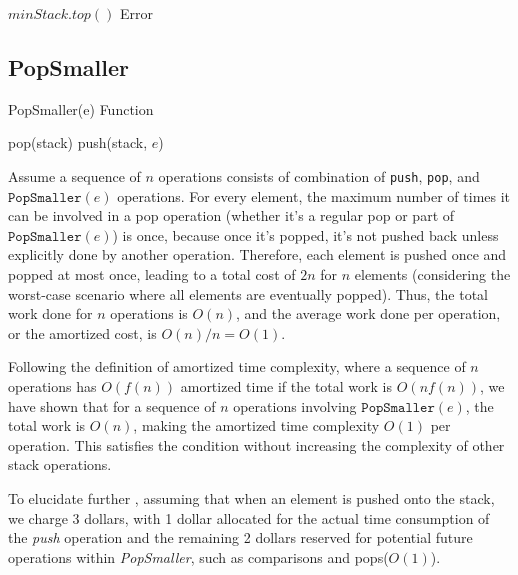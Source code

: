 \documentclass[12pt]{article}
\begin{document}
\begin{algorithm*}
    \begin{algorithmic}[1]
            \State \Return $minStack.top()$
        \Else
            \State \Return Error 
        \EndIf
    \EndFunction
    \end{algorithmic}
\end{algorithm*}

     
    
\newpage

\subsection*{PopSmaller}   

\begin{algorithm}
    \caption{PopSmaller(e) Function}
    \begin{algorithmic}[1]
            \State pop(stack)
        \EndWhile
        \State push(stack, $e$)
    \EndFunction
    \end{algorithmic}
\end{algorithm}

Assume a sequence of $n$ operations consists of combination of 
\texttt{push}, \texttt{pop}, and $\texttt{PopSmaller}(e)$ operations. 
For every element, the maximum number of times it can be involved 
in a pop operation (whether it's a regular pop or part of 
$\texttt{PopSmaller}(e)$) is once, because once it's popped, it's 
not pushed back unless explicitly done by another operation. 
Therefore, each element is pushed once and popped at most once, 
leading to a total cost of $2n$ for $n$ elements 
(considering the worst-case scenario where all elements are 
eventually popped). Thus, the total work done for $n$ operations 
is $O(n)$, and the average work done per operation, or the 
amortized cost, is $O(n) / n = O(1)$.


Following the definition of amortized time complexity, where a 
sequence of $n$ operations has $O(f(n))$ amortized time if the total 
work is $O(nf(n))$, we have shown that for a sequence of $n$ operations 
involving $\texttt{PopSmaller}(e)$, the total work is $O(n)$, making 
the amortized time complexity $O(1)$ per operation. This satisfies 
the condition without increasing the complexity of other stack 
operations.

To elucidate further , 
assuming that when an element is pushed onto the stack, 
we charge 3 dollars, with 1 dollar allocated for the actual 
time consumption of the \textit{push} operation and the 
remaining 2 dollars reserved for potential future operations 
within \textit{PopSmaller}, such as comparisons and pops($O(1)$).
\end{document}
